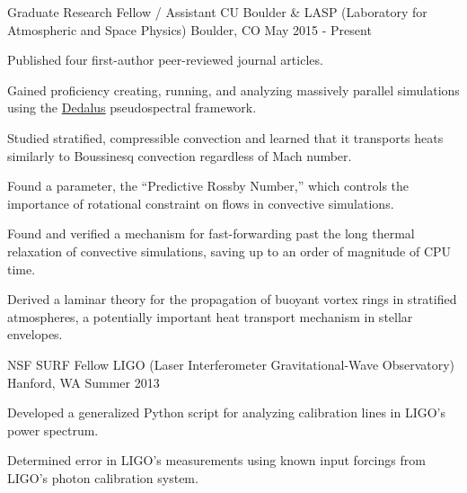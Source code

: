 

\begin{cventries}

  \cventry
    {Graduate Research Fellow / Assistant} %
    {CU Boulder \& LASP (Laboratory for Atmospheric and Space Physics)} %
    {Boulder, CO} %
    {May 2015 - Present} %
    {
      \begin{cvitems} %
	  	\item { Published four first-author peer-reviewed journal articles. }
        \item { Gained proficiency creating, running, and analyzing massively parallel simulations using the \href{http://dedalus-project.org}{Dedalus} pseudospectral framework. }
		\item { Studied stratified, compressible convection and learned that it transports heats similarly to Boussinesq convection regardless of Mach number.}
		\item { Found a parameter, the ``Predictive Rossby Number,'' which controls the importance of rotational constraint on flows in convective simulations.}
		\item { Found and verified a mechanism for fast-forwarding past the long thermal relaxation of convective simulations, saving up to an order of magnitude of CPU time.} 
		\item { Derived a laminar theory for the propagation of buoyant vortex rings in stratified atmospheres, a potentially important heat transport mechanism in stellar envelopes.}
      \end{cvitems}
    }

  \cventry
    {NSF SURF Fellow} %
    {LIGO (Laser Interferometer Gravitational-Wave Observatory)} %
    {Hanford, WA} %
    {Summer 2013} %
    {
      \begin{cvitems} %
        \item {Developed a generalized Python script for analyzing calibration lines in LIGO's power spectrum.}
        \item {Determined error in LIGO's measurements using known input forcings from LIGO's photon calibration system.}
      \end{cvitems}
    }


\end{cventries}
